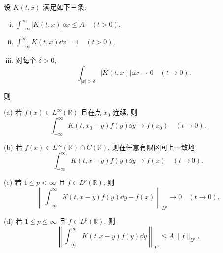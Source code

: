 \begin{theorem}\label{thm:1.1.9}
设 $K(t,x)$ 满足如下三条:
\begin{enumerate}[(i)]
\item $\int_{-\infty}^{\infty}|K(t,x)|\dd x \leq A \quad (t > 0)$, 
\item $\int_{-\infty}^{\infty} K(t,x)\dd x = 1 \quad (t > 0)$, 
\item 对每个 $\delta > 0$, 
\begin{equation*}
\int_{|x| > \delta} |K(t,x)|\dd x \rightarrow 0 \quad (t \rightarrow 0).
\end{equation*}
\end{enumerate}
则

(a) 若 $f(x) \in L^{\infty}(\mathbb{R})$ 且在点 $x_{0}$ 连续, 则
\begin{equation*}
\int_{-\infty}^{\infty} K(t, x_{0} - y)f(y)\dd y \rightarrow f(x_{0}) \quad (t \rightarrow 0).
\end{equation*}

(b) 若 $f(x) \in L^{\infty}(\mathbb{R}) \cap C(\mathbb{R})$, 则在任意有限区间上一致地
\begin{equation*}
\int_{-\infty}^{\infty} K(t, x - y)f(y)\dd y \rightarrow f(x) \quad (t \rightarrow 0).
\end{equation*}

(c) 若 $1 \leq p < \infty$ 且 $f \in L^{p}(\mathbb{R})$, 则
\begin{equation*}
\left\| \int_{-\infty}^{\infty} K(t, x - y)f(y)\dd y - f(x) \right\|_{L^{p}} \rightarrow 0 \quad (t \rightarrow 0).
\end{equation*}

(d) 若 $1 \leq p \leq \infty$ 且 $f \in L^{p}(\mathbb{R})$, 则
\begin{equation*}
\left\| \int_{-\infty}^{\infty} K(t, x - y)f(y)\dd y \right\|_{L^{p}} \leq A\| f \|_{L^{p}}.
\end{equation*}
\end{theorem}

